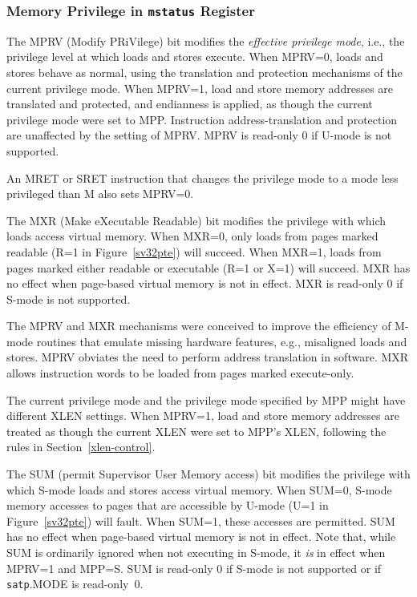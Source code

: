 \subsubsection{Memory Privilege in {\tt mstatus} Register}

The MPRV (Modify PRiVilege) bit modifies the {\em effective privilege mode},
i.e., the privilege level at which loads
and stores execute.  When MPRV=0, loads and stores
behave as normal, using the translation and protection mechanisms of the
current privilege mode.
When MPRV=1, load and store memory addresses are translated and protected, and
endianness is applied, as though the current privilege mode were set to MPP.
Instruction address-translation and protection are unaffected by the setting
of MPRV.  MPRV is read-only 0 if U-mode is not supported.

An MRET or SRET instruction that changes the privilege mode to a mode
less privileged than M also sets MPRV=0.

The MXR (Make eXecutable Readable) bit modifies the privilege with which loads
access virtual memory.  When MXR=0, only loads from pages marked readable (R=1
in Figure~\ref{sv32pte}) will succeed.  When MXR=1, loads from pages marked
either readable or executable (R=1 or X=1) will succeed.  MXR has no effect
when page-based virtual memory is not in effect.  MXR is read-only 0 if
S-mode is not supported.

\begin{commentary}
The MPRV and MXR mechanisms were conceived to improve the efficiency of M-mode
routines that emulate missing hardware features, e.g., misaligned loads and
stores.  MPRV obviates the need to perform address translation in software.
MXR allows instruction words to be loaded from pages marked execute-only.

The current privilege mode and the privilege mode specified by MPP might have
different XLEN settings.  When MPRV=1, load and store memory addresses are
treated as though the current XLEN were set to MPP's XLEN, following the rules
in Section~\ref{xlen-control}.
\end{commentary}

The SUM (permit Supervisor User Memory access) bit modifies the privilege with
which S-mode loads and stores access virtual memory.
When SUM=0, S-mode memory accesses to pages that are accessible by U-mode (U=1
in Figure~\ref{sv32pte}) will fault.  When SUM=1, these accesses are
permitted.  SUM has no effect when page-based virtual memory is not in effect.
Note that, while SUM is ordinarily ignored when not executing in S-mode, it
{\em is} in effect when MPRV=1 and MPP=S.  SUM is read-only 0 if S-mode is
not supported or if {\tt satp}.MODE is read-only~0.

